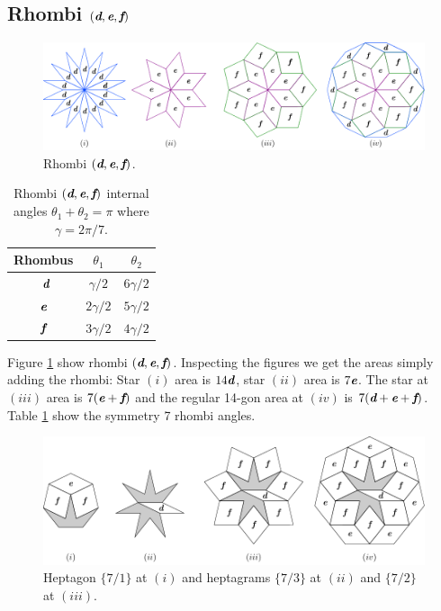 \documentclass[11pt]{article}
\def\mathbi#1{\textbf{\em #1}}
\begin{document}
\subsection{Rhombi $(\mathbi{d},\mathbi{e},\mathbi{f})$}

\begin{figure}[H]
\centering
\includegraphics[scale=1]{def/rhombi}
\caption{Rhombi $(\mathbi{d},\mathbi{e},\mathbi{f})$.}
\label{fig:def-rhombi}
\end{figure}

\begin{table}[H]
\begin{center}
\begin{tabular}{|c|c c|}
\hline
Rhombus & $\theta_1$ & $\theta_2$ \\ %
\hline\
$\mathbi{d}$ & $\gamma/2$ & $6\gamma/2$ \\[0.5ex] \hline
$\mathbi{e}$ & $2\gamma/2$ & $5\gamma/2$ \\[0.5ex] \hline
$\mathbi{f}$ & $3\gamma/2$ & $4\gamma/2$ \\[0.5ex] \hline
\end{tabular}
\caption{Rhombi $(\mathbi{d},\mathbi{e},\mathbi{f})$ internal angles $\theta_1 + \theta_2 = \pi$ where $\gamma = 2\pi/7$.} 
\label{tbl:def-angles}
\end{center}
\end{table}

Figure \ref{fig:def-rhombi} show rhombi $(\mathbi{d},\mathbi{e},\mathbi{f})$. 
Inspecting the figures we get the areas simply adding the rhombi:
Star $(i)$ area is $14\mathbi{d}$, star $(ii)$ area is $7\mathbi{e}$. The star at $(iii)$ area is $7(\mathbi{e} + \mathbi{f})$ and the regular 14-gon area at $(iv)$ is $7(\mathbi{d} + \mathbi{e} + \mathbi{f})$. Table \ref {tbl:def-angles} show the symmetry 7 rhombi angles.


\begin{figure}[H]
\centering
\includegraphics[scale=1.1]{def/hepta}
\caption{Heptagon $\{7/1\}$ at $(i)$ and heptagrams $\{7/3\}$ at $(ii)$ and $\{7/2\}$ at $(iii)$.}
\label{fig:def-hepta}
\end{figure}
\end{document}
